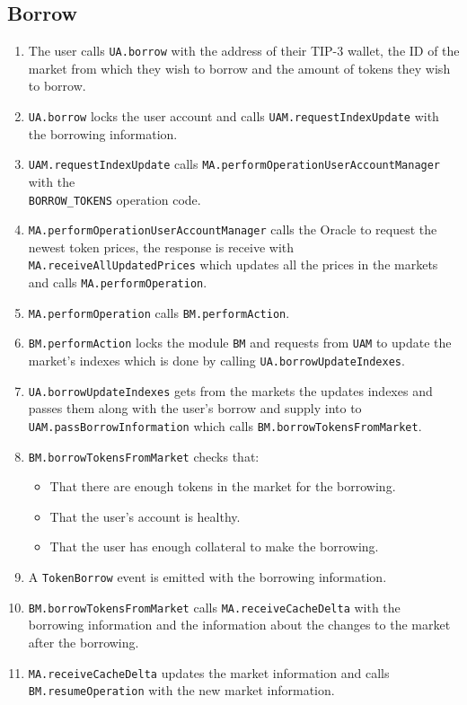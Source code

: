 \subsection{Borrow}
\begin{enumerate}
  \item The user calls \verb|UA.borrow| with the address of their TIP-3 wallet, the ID of the market from which they wish to borrow and the amount of tokens they wish to borrow.
  \item \verb|UA.borrow| locks the user account and calls \verb|UAM.requestIndexUpdate| with the borrowing information.
  \item \verb|UAM.requestIndexUpdate| calls \verb|MA.performOperationUserAccountManager| with the \\\verb|BORROW_TOKENS| operation code.
  \item \verb|MA.performOperationUserAccountManager| calls the Oracle to request the newest token prices, the response is receive with \verb|MA.receiveAllUpdatedPrices| which updates all the prices in the markets and calls \verb|MA.performOperation|.
  \item \verb|MA.performOperation| calls \verb|BM.performAction|.
  \item \verb|BM.performAction| locks the module \verb|BM| and requests from \verb|UAM| to update the market's indexes which is done by calling \verb|UA.borrowUpdateIndexes|.
  \item \verb|UA.borrowUpdateIndexes| gets from the markets the updates indexes and passes them along with the user's borrow and supply into to \verb|UAM.passBorrowInformation| which calls \verb|BM.borrowTokensFromMarket|.
  \item \verb|BM.borrowTokensFromMarket| checks that:
  \begin{itemize}
    \item That there are enough tokens in the market for the borrowing.
    \item That the user's account is healthy.
    \item That the user has enough collateral to make the borrowing.
  \end{itemize}
  \item A \verb|TokenBorrow| event is emitted with the borrowing information.
  \item \verb|BM.borrowTokensFromMarket| calls \verb|MA.receiveCacheDelta| with the borrowing information and the information about the changes to the market after the borrowing.
  \item \verb|MA.receiveCacheDelta| updates the market information and calls \verb|BM.resumeOperation| with the new market information.

\end{enumerate}
